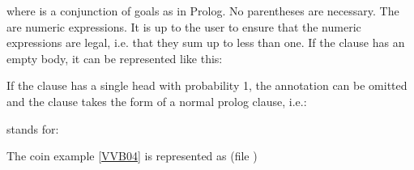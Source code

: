 \documentclass[letterpaper,10pt,english]{sphinxmanual}
\begin{document}
\sphinxAtStartPar
where  is a conjunction of goals as in Prolog.
No parentheses are necessary.
The  are numeric expressions.
It is up to the user to ensure that the numeric expressions are legal, i.e. that they sum up to less than one.
If the clause has an empty body, it can be represented like this:

\begin{sphinxVerbatim}[commandchars=\\\{\}]
    
\end{sphinxVerbatim}

\sphinxAtStartPar
If the clause has a single head with probability 1, the annotation can be omitted and the clause takes
the form of a normal prolog clause, i.e.:

\begin{sphinxVerbatim}[commandchars=\\\{\}]
  
\end{sphinxVerbatim}

\sphinxAtStartPar
stands for:

\begin{sphinxVerbatim}[commandchars=\\\{\}]
  
\end{sphinxVerbatim}

\sphinxAtStartPar
The coin example {[}\hyperlink{cite.index:id45}{VVB04}{]} is represented as (file )

\begin{sphinxVerbatim}[commandchars=\\\{\}]
   

   

  

\end{sphinxVerbatim}
\end{document}
